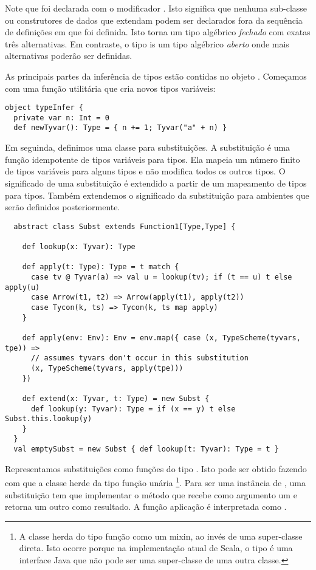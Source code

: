 Note que  foi declarada com o modificador . Isto significa que
nenhuma sub-classe ou construtores de dados que extendam  podem ser declarados fora
da sequência de definições em que  foi definida.
Isto torna  um tipo algébrico {\em fechado}  com exatas três alternativas. 
Em contraste, o tipo  is um tipo algébrico {\em aberto} onde mais alternativas
poderâo ser definidas.

As principais partes da inferência de tipos estão contidas no objeto
. Começamos com uma função utilitária que cria novos tipos variáveis:
\begin{lstlisting}
object typeInfer {
  private var n: Int = 0
  def newTyvar(): Type = { n += 1; Tyvar("a" + n) }
\end{lstlisting}
Em seguinda, definimos uma classe para substituições.
A substituição é uma função idempotente de tipos variáveis para tipos.
Ela mapeia um número finito de tipos variáveis para alguns tipos e não modifica todos 
os outros tipos.
O significado de uma substituição é extendido a partir de um mapeamento de tipos para tipos.
Também extendemos o significado da substituição para ambientes que serão definidos posteriormente.
\begin{lstlisting}
  abstract class Subst extends Function1[Type,Type] {

    def lookup(x: Tyvar): Type

    def apply(t: Type): Type = t match {
      case tv @ Tyvar(a) => val u = lookup(tv); if (t == u) t else apply(u)
      case Arrow(t1, t2) => Arrow(apply(t1), apply(t2))
      case Tycon(k, ts) => Tycon(k, ts map apply)
    }

    def apply(env: Env): Env = env.map({ case (x, TypeScheme(tyvars, tpe)) =>
      // assumes tyvars don't occur in this substitution
      (x, TypeScheme(tyvars, apply(tpe)))
    })

    def extend(x: Tyvar, t: Type) = new Subst {
      def lookup(y: Tyvar): Type = if (x == y) t else Subst.this.lookup(y)
    }
  }
  val emptySubst = new Subst { def lookup(t: Tyvar): Type = t }
\end{lstlisting}
Representamos substituições como funções do tipo . Isto pode ser obtido fazendo com que a classe   herde da tipo função unária  
\footnote{
A classe herda do tipo função como um mixin, ao invés de uma super-classe direta.
Isto ocorre porque na implementação atual de Scala, o tipo  é uma interface Java que
não pode ser uma super-classe de uma outra classe.}.
Para ser uma instância de , uma substituição  tem que implementar o método 
que recebe como argumento um  e retorna um outro 
 como resultado. A função aplicação  é interpretada como .

